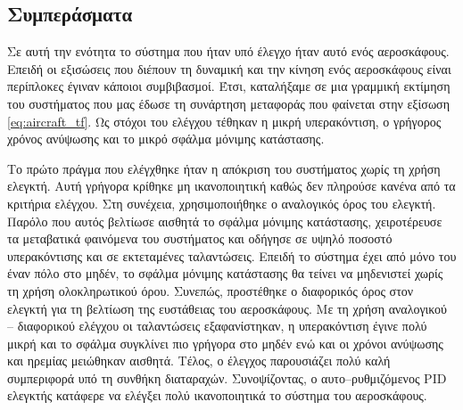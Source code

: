 \subsection{Συμπεράσματα}

Σε αυτή την ενότητα το σύστημα που ήταν υπό έλεγχο ήταν αυτό ενός αεροσκάφους. Επειδή οι εξισώσεις που διέπουν τη δυναμική και την κίνηση ενός αεροσκάφους είναι περίπλοκες έγιναν κάποιοι συμβιβασμοί. Έτσι, καταλήξαμε σε μια γραμμική εκτίμηση του συστήματος που μας έδωσε τη συνάρτηση μεταφοράς που φαίνεται στην εξίσωση \ref{eq:aircraft_tf}. Ως στόχοι του ελέγχου τέθηκαν η μικρή υπερακόντιση, ο γρήγορος χρόνος ανύψωσης και το μικρό σφάλμα μόνιμης κατάστασης.

Το πρώτο πράγμα που ελέγχθηκε ήταν η απόκριση του συστήματος χωρίς τη χρήση ελεγκτή. Αυτή γρήγορα κρίθηκε μη ικανοποιητική καθώς δεν πληρούσε κανένα από τα κριτήρια ελέγχου. Στη συνέχεια, χρησιμοποιήθηκε ο αναλογικός όρος του ελεγκτή. Παρόλο που αυτός βελτίωσε αισθητά το σφάλμα μόνιμης κατάστασης, χειροτέρευσε τα μεταβατικά φαινόμενα του συστήματος και οδήγησε σε υψηλό ποσοστό υπερακόντισης και σε εκτεταμένες ταλαντώσεις. Επειδή το σύστημα έχει από μόνο του έναν πόλο στο μηδέν, το σφάλμα μόνιμης κατάστασης θα τείνει να μηδενιστεί χωρίς τη χρήση ολοκληρωτικού όρου. Συνεπώς, προστέθηκε ο διαφορικός όρος στον ελεγκτή για τη βελτίωση της ευστάθειας του αεροσκάφους. Με τη χρήση αναλογικού -- διαφορικού ελέγχου οι ταλαντώσεις εξαφανίστηκαν, η υπερακόντιση έγινε πολύ μικρή και το σφάλμα συγκλίνει πιο γρήγορα στο μηδέν ενώ και οι χρόνοι ανύψωσης και ηρεμίας μειώθηκαν αισθητά. Τέλος, ο έλεγχος παρουσιάζει πολύ καλή συμπεριφορά υπό τη συνθήκη διαταραχών. Συνοψίζοντας, ο αυτο--ρυθμιζόμενος PID ελεγκτής κατάφερε να ελέγξει πολύ ικανοποιητικά το σύστημα του αεροσκάφους.






















